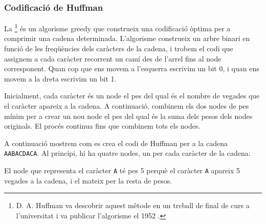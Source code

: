 
\subsubsection{Codificació de Huffman}

La \footnote{D. A. Huffman va descobrir
aquest mètode en un treball de final de curs a l'universitat
i va publicar l'algorisme el 1952 \cite{huf52}.} és un algorisme
greedy que construeix una codificació òptima per
a comprimir una cadena determinada.
L'algorisme construeix un arbre binari
en funció de les freqüències dels caràcters
de la cadena,
i trobem el codi que assignem a cada caràcter
recorrent un camí des de l'arrel fins al node
corresponent.
Quan cop que ens movem a l'esquerra escrivim un bit 0,
i quan ens movem a la dreta escrivim un bit 1.

Inicialment, cada caràcter és un node el pes del qual és el
nombre de vegades que el caràcter apareix a la cadena.
A continuació, combinem els dos nodes de pes mínim
per a crear un nou node el pes del qual és la suma dels
pesos dels nodes originals.
El procés continua fins que combinem tots els nodes.

A continuació mostrem com es crea el codi de Huffman
per a la cadena \texttt{AABACDACA}.
Al principi, hi ha quatre nodes, un per cada caràcter
de la cadena:

\begin{center}
\end{center}
El node que representa el caràcter \texttt{A}
té pes 5 perquè el caràcter \texttt{A}
apareix 5 vegades a la cadena, i el mateix per la
resta de pesos.

